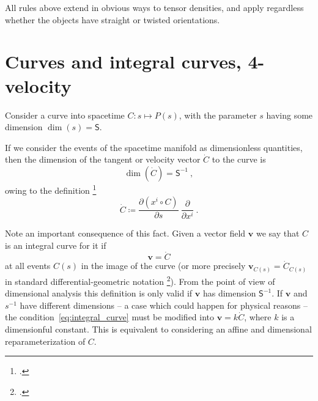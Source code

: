 \documentclass[\ifafour a4paper,12pt,\else a5paper,10pt,\fi%
onecolumn,oneside,article,%
british%
]{memoir}
\newcommand*{\defquote}[1]{`#1'}
\theoremstyle{remark}
\theoremstyle{innote}
\newcommand*{\citep}{\footcites}
\newcommand*{\de}{\partialup}%
\newcommand*{\defd}{\coloneqq}
\renewcommand*{\|}[1][]{\nonscript\,#1\vert\nonscript\;\mathopen{}}
\newcommand*{\sect}{\S}%
\newcommand*{\chap}{ch.}%
\newcommand*{\Ss}{\textsf{S}}
\newcommand*{\yv}{\bm{v}}
\newcommand*{\dex}[1][i]{\frac{\de}{\de x^{#1}}}
\begin{document}
\medskip


All rules above extend in obvious ways to tensor densities, and apply
regardless whether the objects have straight or twisted orientations.



\section{Curves and integral curves, 4-velocity}
\label{sec:curves}


Consider a curve into spacetime $C\colon s \mapsto P(s)$, with the
parameter $s$ having some dimension $\dim(s)=\Ss$.


If we consider the events of the spacetime manifold as dimensionless
quantities, then the dimension of the tangent or velocity vector $\dot{C}$
to the curve is
\begin{equation}
  \label{eq:dim_velocity}
  \dim(\dot{C}) = \Ss^{-1} \ ,
\end{equation}
owing to the definition
\citep[\sect~III.B.1]{choquetbruhatetal1977_r1996}[\sect~IV.(1.9)]{boothby1975_r2003}
\begin{equation}
  \label{eq:def_tangent_curve}
\dot{C} \defd \frac{\de (x^{i} \circ C)}{\de s}\ \dex \ .
\end{equation}

Note an important consequence of this fact. Given a vector field $\yv$ we
say that $C$ is an integral curve for it if
\begin{equation}
  \yv = \dot{C}
  \label{eq:integral_curve}
\end{equation}
at all events $C(s)$ in the image of the curve (or more precisely
$\yv_{C(s)} = \dot{C}_{C(s)}$ in standard differential-geometric notation
\citep[\sect~III.B.1]{choquetbruhatetal1977_r1996}). From the point of view
of dimensional analysis this definition is only valid if $\yv$ has
dimension $\Ss^{-1}$. If $\yv$ and $s^{-1}$ have different dimensions -- a
case which could happen for physical reasons -- the
condition~\eqref{eq:integral_curve} must be modified into
$\yv = k\dot{C}$, where $k$ is a dimensionful constant. This is equivalent
to considering an affine and dimensional reparameterization of $C$.
\end{document}
